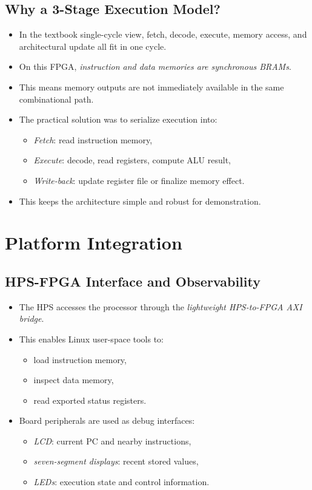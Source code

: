 \documentclass[11pt]{article}
\begin{document}
\subsection*{Why a 3-Stage Execution Model?}
\label{sec:org5ed2827}
\begin{itemize}
\item In the textbook single-cycle view, fetch, decode, execute, memory access, and architectural update all fit in one cycle.
\item On this FPGA, \emph{instruction and data memories are synchronous BRAMs}.
\item This means memory outputs are not immediately available in the same combinational path.
\item The practical solution was to serialize execution into:
\begin{itemize}
\item \emph{Fetch}: read instruction memory,
\item \emph{Execute}: decode, read registers, compute ALU result,
\item \emph{Write-back}: update register file or finalize memory effect.
\end{itemize}
\item This keeps the architecture simple and robust for demonstration.
\end{itemize}
\section*{Platform Integration}
\label{sec:org22b7d4a}
\subsection*{HPS-FPGA Interface and Observability}
\label{sec:orge8287b7}
\begin{itemize}
\item The HPS accesses the processor through the \emph{lightweight HPS-to-FPGA AXI bridge}.
\item This enables Linux user-space tools to:
\begin{itemize}
\item load instruction memory,
\item inspect data memory,
\item read exported status registers.
\end{itemize}
\item Board peripherals are used as debug interfaces:
\begin{itemize}
\item \emph{LCD}: current PC and nearby instructions,
\item \emph{seven-segment displays}: recent stored values,
\item \emph{LEDs}: execution state and control information.
\end{itemize}
\end{itemize}
\end{document}
